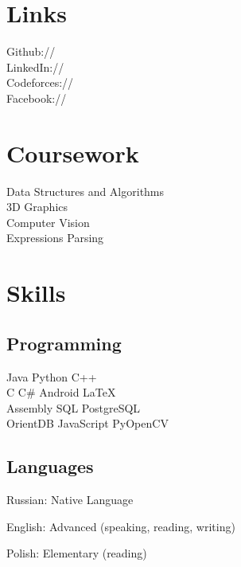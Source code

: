 \documentclass[]{deedy-resume-openfont}
\begin{document}
\begin{minipage}[t]{0.40\textwidth}

\section{Links}
\large
Github://\href{https://github.com/MaximCherchuk}{} \\
LinkedIn://\href{https://www.linkedin.com/in/maxim-cherchuk-6305aaa5/}{} \\
Codeforces://\href{http://codeforces.com/profile/MaxCherchuk}{} \\
Facebook://\href{https://www.facebook.com/profile.php?id=100004263036771}{}
\sectionsep

\section{Coursework}
\large
Data Structures and Algorithms \\
3D Graphics \\
Computer Vision \\
Expressions Parsing \\
\sectionsep


\end{minipage}
\begin{minipage}[t]{0.59\textwidth}

\section{Skills}
\subsection{Programming}
\large
Java \textbullet{} Python \textbullet{} C++\ \\ 
\large
C \textbullet{} C\# \textbullet{} Android \textbullet{} \LaTeX \\

\large
Assembly \textbullet{} SQL \textbullet{} PostgreSQL \\
\textbullet{} OrientDB \textbullet{} JavaScript \textbullet{} PyOpenCV
\sectionsep

\subsection{Languages}
\vspace{\topsep}
\begin{tightemize}
\item Russian: Native Language
\item English: Advanced (speaking, reading, writing)
\item Polish: Elementary (reading)
\end{tightemize}
\sectionsep
\end{minipage}
\end{document}
